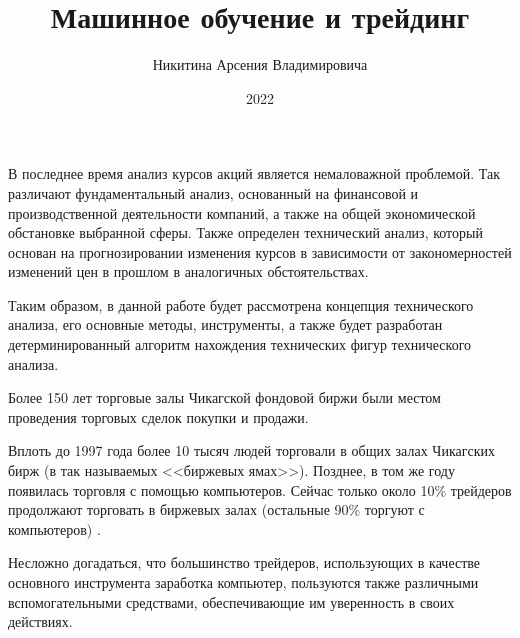 \documentclass[bachelor, och, coursework]{SCWorks}
\begin{document}

\title{Машинное обучение и трейдинг}





\author{Никитина Арсения Владимировича}




\date{2022}

\maketitle


\tableofcontents

\intro
    В последнее время анализ курсов акций является немаловажной проблемой.
    Так различают фундаментальный анализ, основанный на финансовой и
    производственной деятельности компаний, а также на общей экономической
    обстановке выбранной сферы. Также определен технический анализ, который
    основан на прогнозировании изменения курсов в зависимости от
    закономерностей изменений цен в прошлом в аналогичных обстоятельствах.

    Таким образом, в данной работе будет рассмотрена концепция технического
    анализа, его основные методы, инструменты, а также будет разработан
    детерминированный алгоритм нахождения технических фигур технического
    анализа.
    
    Более 150 лет торговые залы Чикагской фондовой биржи были местом проведения
    торговых сделок покупки и продажи.

    Вплоть до 1997 года более 10 тысяч людей торговали в общих залах Чикагских
    бирж (в так называемых <<биржевых ямах>>). Позднее, в том же году появилась
    торговля с помощью компьютеров. Сейчас только около 10\% трейдеров
    продолжают торговать в биржевых залах (остальные 90\% торгуют с
    компьютеров) \cite{HIST}.

    Несложно догадаться, что большинство трейдеров, использующих в качестве
    основного инструмента заработка компьютер, пользуются также различными
    вспомогательными средствами, обеспечивающие им уверенность в своих
    действиях.
\end{document}
